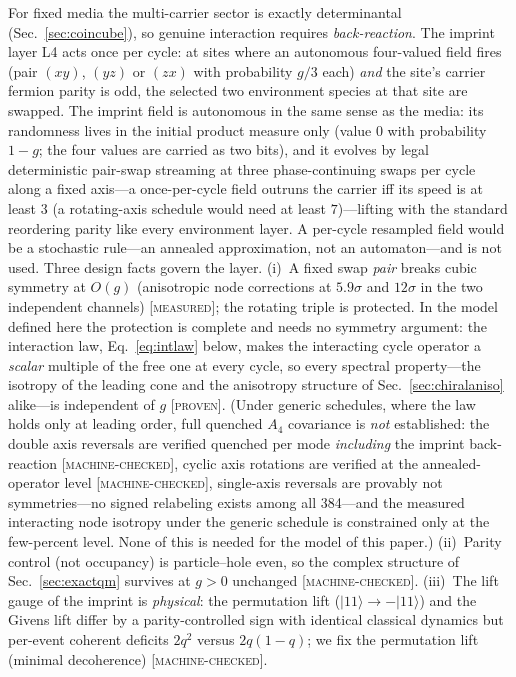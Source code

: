 \documentclass[aps,prd,twocolumn,superscriptaddress,nofootinbib,floatfix]{revtex4-2}
\newcommand{\evP}{\textnormal{\textsc{[proven]}}}
\newcommand{\evM}{\textnormal{\textsc{[machine-checked]}}}
\newcommand{\evX}{\textnormal{\textsc{[measured]}}}
\begin{document}
For fixed media the multi-carrier sector is exactly determinantal
(Sec.~\ref{sec:coincube}), so genuine interaction requires
\emph{back-reaction}. The imprint layer L4 acts once per cycle: at sites
where an autonomous four-valued field fires (pair $(xy)$, $(yz)$ or $(zx)$
with probability $g/3$ each) \emph{and} the site's carrier fermion parity
is odd, the selected two environment species at that site are swapped.
The imprint field is autonomous in the same sense as the media: its
randomness lives in the initial product measure only (value $0$ with
probability $1-g$; the four values are carried as two bits), and it
evolves by legal deterministic pair-swap streaming at three
phase-continuing swaps per cycle along a fixed axis---a once-per-cycle
field outruns the carrier iff its speed is at least $3$ (a rotating-axis
schedule would need at least $7$)---lifting with the standard reordering
parity like every environment layer. A per-cycle resampled field
would be a stochastic rule---an annealed approximation, not an
automaton---and is not used.
Three design facts govern the layer. (i)~A fixed swap \emph{pair}
breaks cubic symmetry at $O(g)$ (anisotropic node corrections at
$5.9\sigma$ and $12\sigma$ in the two independent channels) \evX{}; the
rotating triple is protected. In the model defined here the protection
is complete and needs no symmetry argument: the interaction law,
Eq.~\eqref{eq:intlaw} below, makes the interacting cycle operator a
\emph{scalar} multiple of the free one at every cycle, so every
spectral property---the isotropy of the leading cone and the anisotropy
structure of Sec.~\ref{sec:chiralaniso} alike---is independent of $g$
\evP{}. (Under generic schedules, where the law holds only at leading
order, full quenched $A_4$ covariance is \emph{not} established: the
double axis reversals are verified quenched per mode \emph{including}
the imprint back-reaction \evM{}, cyclic axis rotations are verified at
the annealed-operator level \evM{}, single-axis reversals are provably
not symmetries---no signed relabeling exists among all 384---and the
measured interacting node isotropy under the generic schedule is
constrained only at the few-percent level. None of this is needed for
the model of this paper.)
(ii)~Parity control (not occupancy) is particle--hole even, so the complex
structure of Sec.~\ref{sec:exactqm} survives at $g>0$ unchanged \evM{}.
(iii)~The lift gauge of the imprint is \emph{physical}: the permutation
lift ($|11\rangle\to-|11\rangle$) and the Givens lift differ by a
parity-controlled sign with identical classical dynamics but per-event
coherent deficits $2q^2$ versus $2q(1-q)$; we fix the permutation lift
(minimal decoherence) \evM{}.
\end{document}
